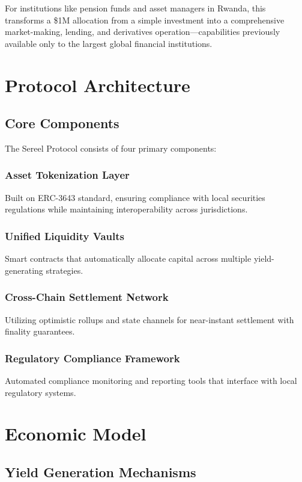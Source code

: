 \documentclass[12pt]{article}
\begin{document}
For institutions like pension funds and asset managers in Rwanda, this transforms a \$1M allocation from a simple investment into a comprehensive market-making, lending, and derivatives operation—capabilities previously available only to the largest global financial institutions.

\section{Protocol Architecture}

\subsection{Core Components}

The Sereel Protocol consists of four primary components:

\subsubsection{Asset Tokenization Layer}
Built on ERC-3643 standard, ensuring compliance with local securities regulations while maintaining interoperability across jurisdictions.

\subsubsection{Unified Liquidity Vaults}
Smart contracts that automatically allocate capital across multiple yield-generating strategies.

\subsubsection{Cross-Chain Settlement Network}
Utilizing optimistic rollups and state channels for near-instant settlement with finality guarantees.

\subsubsection{Regulatory Compliance Framework}
Automated compliance monitoring and reporting tools that interface with local regulatory systems.

\section{Economic Model}

\subsection{Yield Generation Mechanisms}
\end{document}
